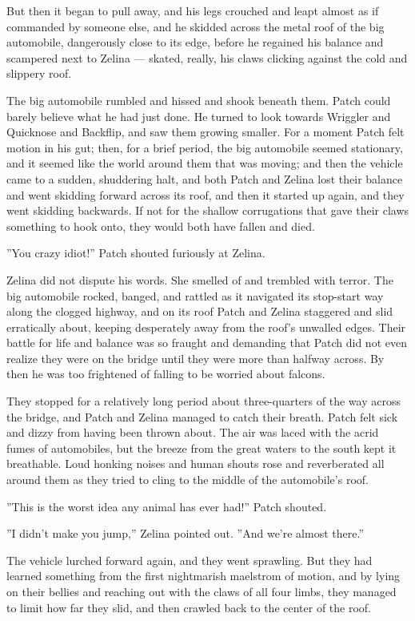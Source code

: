 \documentclass[12pt]{book}
\begin{document}
But then it began to pull away, and his legs crouched and leapt almost
as if commanded by someone else, and he skidded across the metal roof
of the big automobile, dangerously close to its edge, before he
regained his balance and scampered next to Zelina --- skated, really,
his claws clicking against the cold and slippery roof.

The big automobile rumbled and hissed and shook beneath them. Patch
could barely believe what he had just done. He turned to look towards
Wriggler and Quicknose and Backflip, and saw them growing smaller. For
a moment Patch felt motion in his gut; then, for a brief period, the
big automobile seemed stationary, and it seemed like the world around
them that was moving; and then the vehicle came to a sudden,
shuddering halt, and both Patch and Zelina lost their balance and went
skidding forward across its roof, and then it started up again, and
they went skidding backwards. If not for the shallow corrugations that
gave their claws something to hook onto, they would both have fallen
and died.

''You crazy idiot!'' Patch shouted furiously at Zelina.

Zelina did not dispute his words. She smelled of and trembled with
terror. The big automobile rocked, banged, and rattled as it navigated
its stop-start way along the clogged highway, and on its roof Patch
and Zelina staggered and slid erratically about, keeping desperately
away from the roof's unwalled edges. Their battle for life and balance
was so fraught and demanding that Patch did not even realize they were
on the bridge until they were more than halfway across. By then he was
too frightened of falling to be worried about falcons.

They stopped for a relatively long period about three-quarters of the
way across the bridge, and Patch and Zelina managed to catch their
breath. Patch felt sick and dizzy from having been thrown about. The
air was laced with the acrid fumes of automobiles, but the breeze from
the great waters to the south kept it breathable. Loud honking noises
and human shouts rose and reverberated all around them as they tried
to cling to the middle of the automobile's roof.

''This is the worst idea any animal has ever had!'' Patch shouted.

''I didn't make you jump,'' Zelina pointed out. ''And we're almost
there.''

The vehicle lurched forward again, and they went sprawling. But they
had learned something from the first nightmarish maelstrom of motion,
and by lying on their bellies and reaching out with the claws of all
four limbs, they managed to limit how far they slid, and then crawled
back to the center of the roof.
\end{document}

